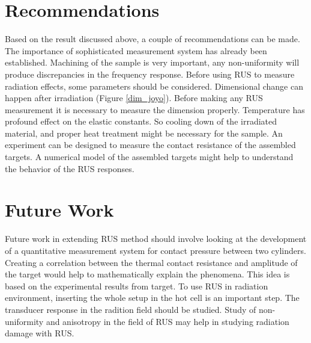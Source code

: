 \begin{doublespacing}
\section{Recommendations}
Based on the result discussed above, a couple of recommendations can be made. The importance of sophisticated measurement system has already been established. Machining of the sample is very important, any non-uniformity will produce discrepancies in the frequency response. Before using RUS to measure radiation effects, some parameters should be considered. Dimensional change can happen after irradiation (Figure \ref{dim_joyo}). Before making any RUS measurement it is necessary to measure the dimension properly. Temperature has profound effect on the elastic constants. So cooling down of the irradiated material, and proper heat treatment might be necessary for the sample. An experiment can be designed to  measure the contact resistance of the assembled targets. A numerical model of the assembled targets might help to understand the behavior of the RUS responses. 

\section{Future Work}
Future work in extending RUS method should involve looking at the development of a quantitative measurement system for contact pressure between two cylinders. Creating a correlation between the thermal contact resistance and amplitude of the target would help to mathematically explain the phenomena. This idea is based on the experimental results from target. To use RUS in radiation environment, inserting the whole setup in the hot cell is an important step. The transducer response in the radition field should be studied. Study of non-uniformity and anisotropy in the field of RUS may help in studying radiation damage with RUS.


\end{doublespacing}